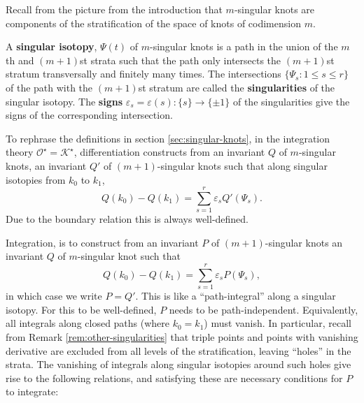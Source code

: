 Recall from the picture from the introduction that \(m\)-singular knots are components of the stratification of the space of knots of codimension \(m\).

\begin{definition}
	A \textbf{singular isotopy}, \(\Psi(t)\) of \(m\)-singular knots is a path in the union of the \(m\)th and \((m + 1)\)st strata such that the path only intersects the \((m + 1)\)st stratum transversally and finitely many times. The intersections \(\{\Psi_{s} : 1 \leq s \leq r\}\) of the path with the \((m + 1)\)st stratum are called the \textbf{singularities} of the singular isotopy. The \textbf{signs} \(\varepsilon_{s} = \varepsilon(s): \{s\} \to \{\pm 1\}\) of the singularities give the signs of the corresponding intersection.
\end{definition}


To rephrase the definitions in section \ref{sec:singular-knots}, in the integration theory \(\mathcal{O}^{\star} = \mathcal{K}^{\star}\), differentiation constructs from an invariant \(Q\) of \(m\)-singular knots, an invariant \(Q'\) of \((m + 1)\)-singular knots such that along singular isotopies from \(k_{0}\) to \(k_{1}\),
\[Q(k_{0}) - Q(k_{1}) = \sum_{s = 1}^{r}\varepsilon_{s} Q'(\Psi_{s}).\]
Due to the boundary relation this is always well-defined.

Integration, is to construct from an invariant \(P\) of \((m + 1)\)-singular knots an invariant \(Q\) of \(m\)-singular knot such that
\[Q(k_{0}) - Q(k_{1}) = \sum_{s = 1}^{r}\varepsilon_{s} P(\Psi_{s}),\]
in which case we write \(P = Q'\). This is like a ``path-integral'' along a singular isotopy. For this to be well-defined, \(P\) needs to be path-independent. Equivalently, all integrals along closed paths (where \(k_{0} = k_{1}\)) must vanish. In particular, recall from Remark \ref{rem:other-singularities} that triple points and points with vanishing derivative are excluded from all levels of the stratification, leaving ``holes'' in the strata. The vanishing of integrals along singular isotopies around such holes give rise to the following relations, and satisfying these are necessary conditions for \(P\) to integrate:

